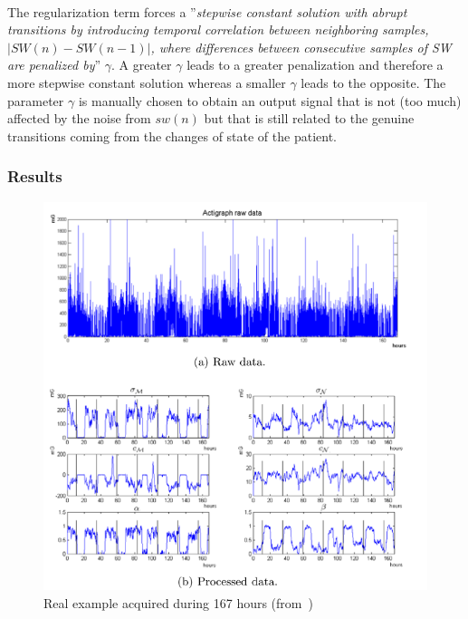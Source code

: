 \documentclass[a4paper,12pt]{article}
\begin{document}
\paragraph{}
The regularization term forces a ''\textit{stepwise constant solution with abrupt transitions by introducing temporal correlation between neighboring samples, $|SW(n) - SW(n-1)|$, where differences between consecutive samples of SW are penalized by}''\cite{Pires2009} $\gamma$. A greater $\gamma$ leads to a greater penalization and therefore a more stepwise constant solution whereas a smaller $\gamma$ leads to the opposite. The parameter $\gamma$ is manually chosen to obtain an output signal that is not (too much) affected by the noise from $sw(n)$ but that is still related to the genuine transitions coming from the changes of state of the patient.

\subsubsection{Results}

\begin{figure}[H]
\centering
\includegraphics[scale=0.5]{Images/PiresResults1.png}
\caption{Real example acquired during 167 hours (from~\cite{Pires2009})}
\label{PiresResults1}
\end{figure}
\end{document}
